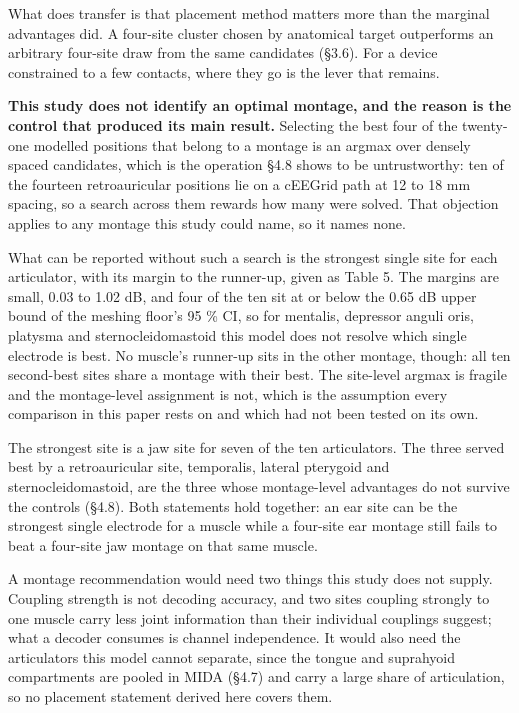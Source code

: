 \documentclass[
  11pt,
  a4paper,
]{article}
\newcounter{none} %
\begin{document}
What does transfer is that placement method matters more than the marginal
advantages did. A four-site cluster chosen by anatomical target outperforms an
arbitrary four-site draw from the same candidates (§3.6). For a device
constrained to a few contacts, where they go is the lever that remains.

\textbf{This study does not identify an optimal montage, and the reason is the control
that produced its main result.} Selecting the best four of the twenty-one modelled positions that belong to a montage is an argmax over densely spaced candidates, which is the
operation §4.8 shows to be untrustworthy: ten of the fourteen retroauricular
positions lie on a cEEGrid path at 12 to 18 mm spacing, so a search across them
rewards how many were solved. That objection applies to any montage this study
could name, so it names none.

What can be reported without such a search is the strongest single site for each
articulator, with its margin to the runner-up, given as Table 5. The margins are
small, 0.03 to 1.02 dB, and four of the ten sit at or below the 0.65 dB upper
bound of the meshing floor's 95 \% CI, so for mentalis, depressor anguli oris,
platysma and sternocleidomastoid this model does not resolve which single
electrode is best. No muscle's runner-up sits in the other montage, though: all
ten second-best sites share a montage with their best. The site-level argmax is
fragile and the montage-level assignment is not, which is the assumption every
comparison in this paper rests on and which had not been tested on its own.

The strongest site is a jaw site for seven of the ten articulators. The three
served best by a retroauricular site, temporalis, lateral pterygoid and
sternocleidomastoid, are the three whose montage-level advantages do not survive
the controls (§4.8). Both statements hold together: an ear site can be the
strongest single electrode for a muscle while a four-site ear montage still
fails to beat a four-site jaw montage on that same muscle.

A montage recommendation would need two things this study does not supply.
Coupling strength is not decoding accuracy, and two sites coupling strongly to
one muscle carry less joint information than their individual couplings suggest;
what a decoder consumes is channel independence. It would also need the
articulators this model cannot separate, since the tongue and suprahyoid
compartments are pooled in MIDA (§4.7) and carry a large share of articulation,
so no placement statement derived here covers them.
\end{document}
